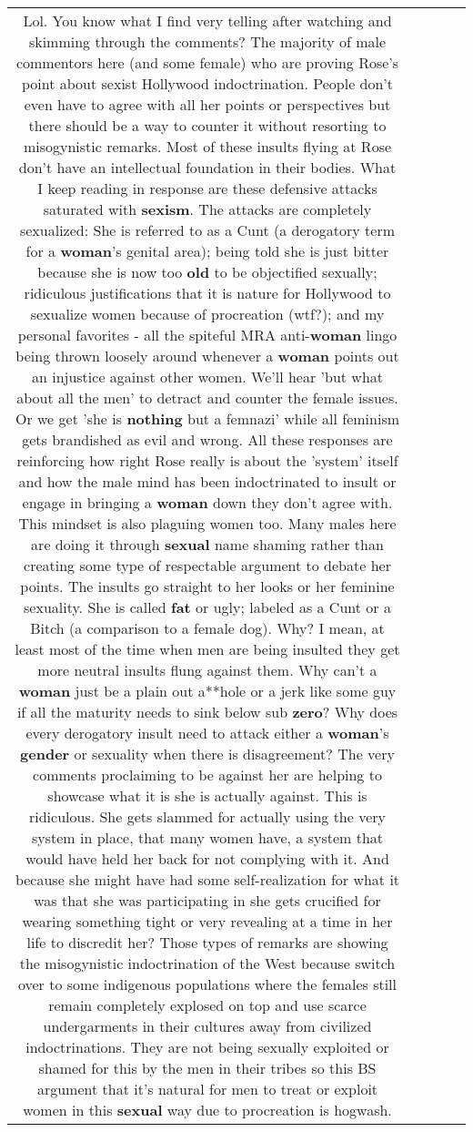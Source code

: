 \documentclass[11pt]{article}
\newlength\mylength
\begin{document}
\begin{center}
\begin{longtable}{|C{.65\mylength}|C{.30\mylength}|C{.12\mylength}|C{.12\mylength}|C{.12\mylength}|}
  \small Lol.  You know what I find very telling after watching and skimming through the comments?  The majority of male commentors here (and some female) who are proving Rose's point about sexist Hollywood indoctrination.  People don't even have to agree with all her points or perspectives but there should be a way to counter it without resorting to misogynistic remarks.  Most of these insults flying at Rose don't have an intellectual foundation in their bodies.  What I keep reading in response are these defensive attacks saturated with \textbf{sexism}.  The attacks are completely sexualized:   She is referred to as a Cunt (a derogatory term for a \textbf{woman}'s genital area); being told she is just bitter because she is now too \textbf{old} to be objectified sexually; ridiculous justifications that it is nature for Hollywood to sexualize women because of procreation (wtf?); and my personal favorites - all the spiteful MRA anti-\textbf{woman} lingo being thrown loosely around whenever a \textbf{woman} points out an injustice against other women.  We'll hear  'but what about all the men' to detract and counter the female issues.   Or we get 'she is \textbf{nothing} but a femnazi' while all feminism gets brandished as evil and wrong.  All these responses are reinforcing how right Rose really is about the 'system' itself and how the male mind has been indoctrinated to insult or engage in bringing a \textbf{woman} down they don't agree with.   This mindset is also plaguing women too.   Many males here are doing it through \textbf{sexual} name shaming rather than creating some type of respectable argument to debate her points.  The insults go straight to her looks or her feminine sexuality.  She is called \textbf{fat} or ugly; labeled as a Cunt or a Bitch (a comparison to a female dog).  Why?  I mean, at least most of the time when men are being insulted they get more neutral insults flung against them.  Why can't a \textbf{woman} just be a plain out a**hole or a jerk like some guy if all the maturity needs to sink below sub \textbf{zero}?  Why does every derogatory insult need to attack either a \textbf{woman}'s \textbf{gender} or sexuality when there is disagreement?   The very comments proclaiming to be against her are helping to showcase what it is she is actually against.  This is ridiculous.  She gets slammed for actually using the very system in place, that many women have, a system that would have held her back for not complying with it.  And because she might have had some self-realization for what it was that she was participating in she gets crucified for wearing something tight or very revealing at a time in her life to discredit her?  Those types of remarks are showing the misogynistic indoctrination of the West because switch over to some indigenous populations where the females still remain completely explosed on top and use scarce undergarments in their cultures away from civilized indoctrinations.  They are not being sexually exploited or shamed for this by the men in their tribes so this BS argument that it's natural for men to treat or exploit women in this \textbf{sexual} way due to procreation is hogwash.\normalsize   & 
\end{longtable}
\end{center}
\end{document}
